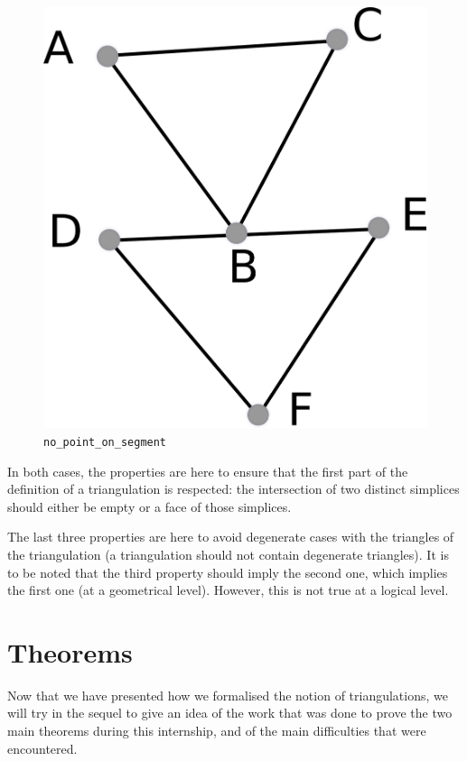 \documentclass[a4paper,10pt]{article}
\begin{document}
\begin{enumerate}
\begin{figure}
\centering
\includegraphics[scale=2]{nps}
\caption{\label{nps} {\tt no\_point\_on\_segment}}
\end{figure}
\end{enumerate}
In both cases, the properties are here to ensure that the first part of the definition of a triangulation is respected: the intersection of two distinct simplices should either be empty or a face of those simplices.

The last three properties are here to avoid degenerate cases with the triangles of the triangulation (a triangulation should not contain degenerate triangles). It is to be noted that the third property should imply the second one, which implies the first one (at a geometrical level). However, this is not true at a logical level.




\section{Theorems}
\label{theorems}
Now that we have presented how we formalised the notion of triangulations, we will try in the sequel to give an idea of the work that was done to prove the two main theorems during this internship, and of the main difficulties that were encountered.
\end{document}
